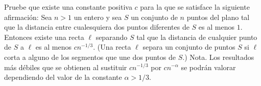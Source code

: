 Pruebe que existe una constante positiva $c$ para la que se satisface la siguiente afirmación:
Sea $n \gt 1$ un entero y sea $S$ un conjunto de $n$ puntos del plano tal que la distancia entre cualesquiera dos puntos diferentes de $S$ es al menos $1$. Entonces existe una recta $\ell$ separando $S$ tal que la distancia de cualquier punto de $S$ a $\ell$ es al menos $cn^{-1/3}$.
(Una recta $\ell$ separa un conjunto de puntos $S$ si $\ell$ corta a alguno de los segmentos que une dos puntos de $S$.)
Nota. Los resultados más débiles que se obtienen al sustituir $cn^{-1/3}$ por $cn^{-\alpha}$ se podrán valorar dependiendo del valor de la constante $\alpha \gt 1/3$.
